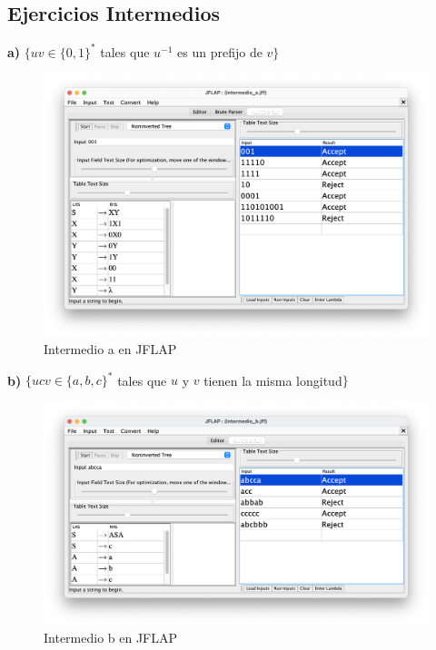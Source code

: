 \newpage

\subsection{Ejercicios Intermedios}

\textbf{a)}  $\{ uv \in \{0,1\}^{\ast} $ tales que $u^{-1}$ es un prefijo de $v\}$

\begin{figure}[H] 
	\centering
	\includegraphics[scale=0.35]{../practica_1/images/intermedio_a.png} 
	\caption{Intermedio a en JFLAP} 
    \label{fig:intermedio_a}
\end{figure}

\textbf{b)}  $\{ ucv \in \{a,b,c\}^{\ast} $ tales que $u$ y $v$ tienen la misma longitud$\}$

\begin{figure}[H] 
	\centering
	\includegraphics[scale=0.35]{../practica_1/images/intermedio_b.png} 
	\caption{Intermedio b en JFLAP} 
    \label{fig:intermedio_b}
\end{figure}

